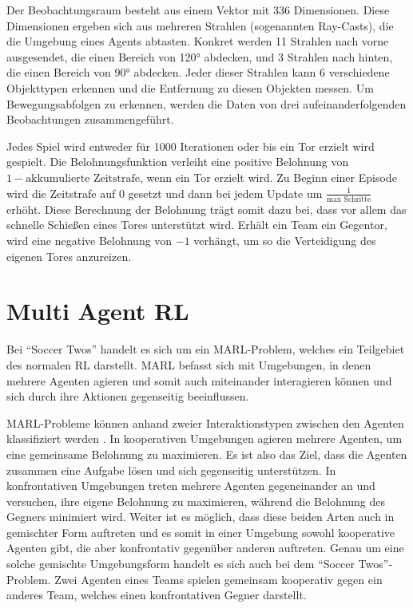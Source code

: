 Der Beobachtungsraum besteht aus einem Vektor mit 336 Dimensionen. Diese Dimensionen ergeben sich aus mehreren Strahlen (sogenannten Ray-Casts), die die Umgebung eines Agents abtasten. Konkret werden 11 Strahlen nach vorne ausgesendet, die einen Bereich von 120° abdecken, und 3 Strahlen nach hinten, die einen Bereich von 90° abdecken. Jeder dieser Strahlen kann 6 verschiedene Objekttypen erkennen und die Entfernung zu diesen Objekten messen. Um Bewegungsabfolgen zu erkennen, werden die Daten von drei aufeinanderfolgenden Beobachtungen zusammengeführt. %

Jedes Spiel wird entweder für 1000 Iterationen oder bis ein Tor erzielt wird gespielt. Die Belohnungsfunktion verleiht eine positive Belohnung von \(1 - \text{akkumulierte Zeitstrafe}\), wenn ein Tor erzielt wird. Zu Beginn einer Episode wird die Zeitstrafe auf \(0\) gesetzt und dann bei jedem Update um \( \frac{1}{\text{max Schritte}} \) erhöht. Diese Berechnung der Belohnung trägt somit dazu bei, dass vor allem das schnelle Schießen eines Tores unterstützt wird.  Erhält ein Team ein Gegentor, wird eine negative Belohnung von \(-1\) verhängt, um so die Verteidigung des eigenen Tores anzureizen.

\section{Multi Agent \acl{RL}}

Bei \enquote{Soccer Twos} handelt es sich um ein \ac{MARL}-Problem, welches ein Teilgebiet des normalen \ac{RL} darstellt. \ac{MARL} befasst sich mit Umgebungen, in denen mehrere Agenten agieren und somit auch miteinander interagieren können und sich durch ihre Aktionen gegenseitig beeinflussen.

\ac{MARL}-Probleme können anhand zweier Interaktionstypen zwischen den Agenten klassifiziert werden \cite{10.1007/11691839_1}. In kooperativen Umgebungen agieren mehrere Agenten, um eine gemeinsame Belohnung zu maximieren. Es ist also das Ziel, dass die Agenten zusammen eine Aufgabe lösen und sich gegenseitig unterstützen. In konfrontativen Umgebungen treten mehrere Agenten gegeneinander an und versuchen, ihre eigene Belohnung zu maximieren, während die Belohnung des Gegners minimiert wird.
Weiter ist es möglich, dass diese beiden Arten auch in gemischter Form auftreten und es somit in einer Umgebung sowohl kooperative Agenten gibt, die aber konfrontativ gegenüber anderen auftreten. Genau um eine solche gemischte Umgebungsform handelt es sich auch bei dem \enquote{Soccer Twos}-Problem. Zwei Agenten eines Teams spielen gemeinsam kooperativ gegen ein anderes Team, welches einen konfrontativen Gegner darstellt.

